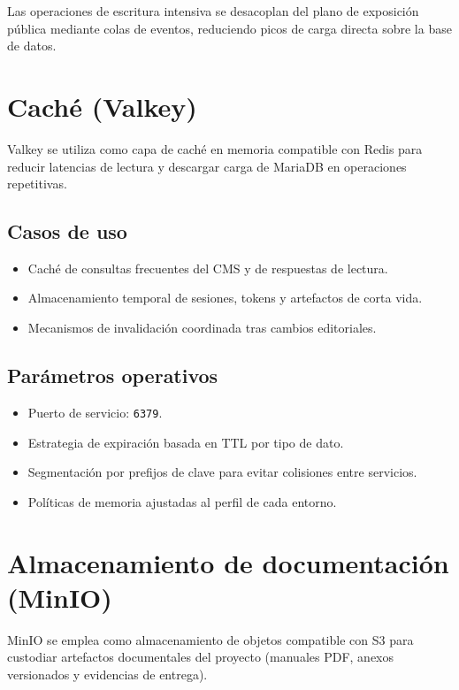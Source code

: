 Las operaciones de escritura intensiva se desacoplan del plano de exposición pública mediante colas de eventos, reduciendo picos de carga directa sobre la base de datos.

\section{Caché (Valkey)}

Valkey se utiliza como capa de caché en memoria compatible con Redis para reducir latencias de lectura y descargar carga de MariaDB en operaciones repetitivas.

\subsection*{Casos de uso}

\begin{itemize}
\item Caché de consultas frecuentes del CMS y de respuestas de lectura.
\item Almacenamiento temporal de sesiones, tokens y artefactos de corta vida.
\item Mecanismos de invalidación coordinada tras cambios editoriales.
\end{itemize}

\subsection*{Parámetros operativos}

\begin{itemize}
\item Puerto de servicio: \texttt{6379}.
\item Estrategia de expiración basada en TTL por tipo de dato.
\item Segmentación por prefijos de clave para evitar colisiones entre servicios.
\item Políticas de memoria ajustadas al perfil de cada entorno.
\end{itemize}

\section{Almacenamiento de documentación (MinIO)}

MinIO se emplea como almacenamiento de objetos compatible con S3 para custodiar artefactos documentales del proyecto (manuales PDF, anexos versionados y evidencias de entrega).

